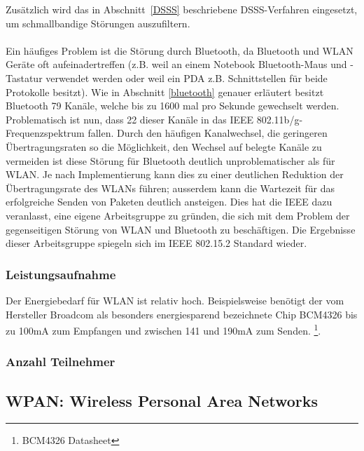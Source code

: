            Zusätzlich wird das in Abschnitt~\ref{DSSS} beschriebene DSSS-Verfahren
            eingesetzt, um schmallbandige Störungen auszufiltern. \\
            \\
            Ein häufiges Problem ist die Störung durch Bluetooth, da 
            Bluetooth und WLAN Geräte oft aufeinadertreffen (z.B. weil an einem
            Notebook Bluetooth-Maus und -Tastatur verwendet werden oder weil 
            ein PDA z.B. Schnittstellen für beide Protokolle besitzt).
            Wie in Abschnitt \ref{bluetooth} genauer erläutert besitzt Bluetooth
            79 Kanäle, welche bis zu 1600 mal pro Sekunde gewechselt werden.
            Problematisch ist nun, dass 22 dieser Kanäle in das 
            IEEE 802.11b/g-Frequenzspektrum fallen. Durch den häufigen
            Kanalwechsel, die geringeren Übertragungsraten so die 
            Möglichkeit, den Wechsel auf belegte Kanäle zu vermeiden ist diese
            Störung für Bluetooth deutlich unproblematischer als für WLAN. 
            Je nach Implementierung kann dies zu einer deutlichen Reduktion
            der Übertragungsrate des WLANs führen; ausserdem kann die Wartezeit
            für das erfolgreiche Senden von Paketen deutlich ansteigen.
            Dies hat die IEEE dazu veranlasst, eine eigene Arbeitsgruppe
            zu gründen, die sich mit dem Problem der gegenseitigen Störung
            von WLAN und Bluetooth zu beschäftigen. Die Ergebnisse dieser
            Arbeitsgruppe spiegeln sich im IEEE 802.15.2 Standard wieder.

        \subsubsection{Leistungsaufnahme}
            Der Energiebedarf für WLAN ist relativ hoch. Beispielsweise benötigt der
            vom Hersteller Broadcom als besonders energiesparend bezeichnete Chip
            BCM4326 bis zu 100mA zum Empfangen und zwischen 141 und 190mA zum Senden.
            \footnote{BCM4326 Datasheet}. 

        \subsubsection{Anzahl Teilnehmer}

    \subsection{WPAN: Wireless Personal Area Networks}
